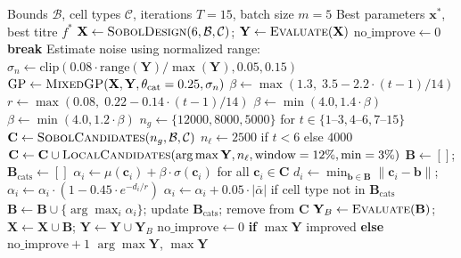 \documentclass[11pt,a4paper]{article}
\begin{document}
\begin{algorithm}[H]
\caption{Robust Batch Bayesian Optimization}
\begin{algorithmic}[1]
\Require Bounds $\mathcal{B}$, cell types $\mathcal{C}$, iterations $T=15$, batch size $m=5$
\Ensure Best parameters $\mathbf{x}^*$, best titre $f^*$
\State $\mathbf{X} \gets \textsc{SobolDesign}(6, \mathcal{B}, \mathcal{C})$; \quad $\mathbf{Y} \gets \textsc{Evaluate}(\mathbf{X})$
\State $\text{no\_improve} \gets 0$
     \textbf{break} \EndIf
    \State Estimate noise using normalized range:
    \State \hspace{1em} $\sigma_n \gets \text{clip}(0.08 \cdot \text{range}(\mathbf{Y})/\max(\mathbf{Y}), 0.05, 0.15)$
    \State $\text{GP} \gets \textsc{MixedGP}(\mathbf{X}, \mathbf{Y}, \theta_{\text{cat}}=0.25, \sigma_n)$ 
    \State $\beta \gets \max(1.3, \; 3.5 - 2.2 \cdot (t-1)/14)$
    \State $r \gets \max(0.08, \; 0.22 - 0.14 \cdot (t-1)/14)$
     $\beta \gets \min(4.0, 1.4 \cdot \beta)$ \EndIf
     $\beta \gets \min(4.0, 1.2 \cdot \beta)$ \EndIf
    \State $n_g \gets \{12000, 8000, 5000\}$ for $t \in \{1\text{--}3, 4\text{--}6, 7\text{--}15\}$
    \State $\mathbf{C} \gets \textsc{SobolCandidates}(n_g, \mathcal{B}, \mathcal{C})$
        \State $n_\ell \gets 2500$ if $t < 6$ else $4000$
        \State $\mathbf{C} \gets \mathbf{C} \cup \textsc{LocalCandidates}(\arg\max \mathbf{Y}, n_\ell, \text{window}=12\%, \text{min}=3\%)$
    \EndIf
    \State $\mathbf{B} \gets []$; $\mathbf{B}_{\text{cats}} \gets []$
     
        \State $\alpha_i \gets \mu(\mathbf{c}_i) + \beta \cdot \sigma(\mathbf{c}_i)$ for all $\mathbf{c}_i \in \mathbf{C}$
            \State $d_i \gets \min_{\mathbf{b} \in \mathbf{B}} \|\mathbf{c}_i - \mathbf{b}\|$; \quad $\alpha_i \gets \alpha_i \cdot (1 - 0.45 \cdot e^{-d_i/r})$
            \State $\alpha_i \gets \alpha_i + 0.05 \cdot |\bar{\alpha}|$ if cell type not in $\mathbf{B}_{\text{cats}}$
        \EndIf
        \State $\mathbf{B} \gets \mathbf{B} \cup \{\arg\max_i \alpha_i\}$; update $\mathbf{B}_{\text{cats}}$; remove from $\mathbf{C}$
    \EndFor
    \State $\mathbf{Y}_B \gets \textsc{Evaluate}(\mathbf{B})$; \quad $\mathbf{X} \gets \mathbf{X} \cup \mathbf{B}$; \quad $\mathbf{Y} \gets \mathbf{Y} \cup \mathbf{Y}_B$
    \State $\text{no\_improve} \gets 0$ \textbf{if} $\max \mathbf{Y}$ improved \textbf{else} $\text{no\_improve} + 1$
\EndFor
\State \Return $\arg\max \mathbf{Y}$, $\max \mathbf{Y}$
\end{algorithmic}
\end{algorithm}
\end{document}
